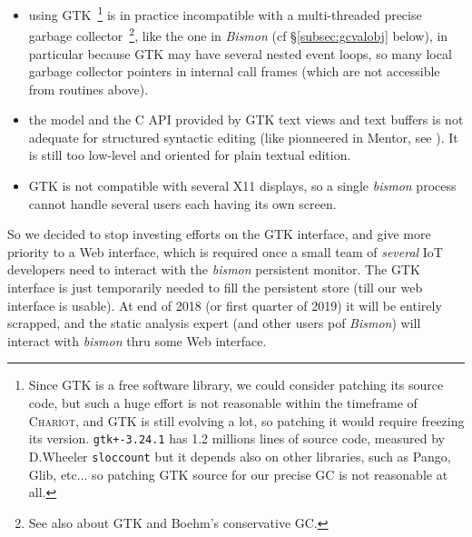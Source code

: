 \begin{itemize}
\item using GTK~\footnote{Since GTK is a free software library, we
  could consider patching its source code, but such a huge effort is
  not reasonable within the timeframe of \textsc{Chariot}, and GTK is
  still evolving a lot, so patching it would require freezing its
  version. \texttt{gtk+-3.24.1} has 1.2 millions lines of source code,
  measured by D.Wheeler \texttt{sloccount} but it depends also on
  other libraries, such as Pango, Glib, etc... so patching GTK source
  for our precise GC is not reasonable at all.}  is in practice
  incompatible with a multi-threaded precise garbage
  collector~\footnote{See also
     about GTK and
    Boehm's conservative GC.}, like the one in \emph{Bismon} (cf
  \S\ref{subsec:gcvalobj} below), in particular because GTK may have
  several nested event loops, so many local garbage collector pointers
  in internal call frames (which are not accessible from routines
  above).

    \item the model and the C API provided by GTK text views and text
      buffers is not adequate for structured syntactic editing (like
      pionneered in Mentor, see \cite{donzeaugouge:inria-mentor}). It is still too low-level and oriented for plain textual edition.

      \item GTK is not compatible with several X11 displays, so a
        single \emph{bismon} process cannot handle several users each
        having its own screen.
\end{itemize}

So we decided to stop investing efforts on the GTK interface, and give
more priority to a Web interface, which is required once a small team
of \emph{several} IoT developers need to interact with the
\emph{bismon} persistent monitor. The GTK interface is just
temporarily needed to fill the persistent store (till our web
interface is usable). At end of 2018 (or first quarter of 2019) it
will be entirely scrapped, and the static analysis expert (and other
users pof \emph{Bismon}) will interact with \emph{bismon} thru some
Web interface.


